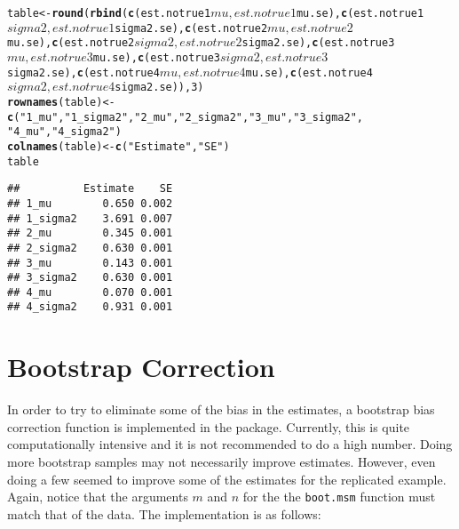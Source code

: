 \documentclass{article}\usepackage{graphicx, color}
\makeatletter
\newcommand{\hlfunctioncall}[1]{\textcolor[rgb]{0.501960784313725,0,0.329411764705882}{\textbf{#1}}}%
\newcommand{\hlstring}[1]{\textcolor[rgb]{0.6,0.6,1}{#1}}%
\newenvironment{kframe}{%
 \def\at@end@of@kframe{}%
 \ifinner\ifhmode%
  \def\at@end@of@kframe{\end{minipage}}%
  \begin{minipage}{\columnwidth}%
 \fi\fi%
 \def\FrameCommand##1{\hskip\@totalleftmargin \hskip-\fboxsep
 \colorbox{shadecolor}{##1}\hskip-\fboxsep
     \hskip-\linewidth \hskip-\@totalleftmargin \hskip\columnwidth}%
 \MakeFramed {\advance\hsize-\width
   \@totalleftmargin\z@ \linewidth\hsize
   \@setminipage}}%
 {\par\unskip\endMakeFramed%
 \at@end@of@kframe}
\newenvironment{knitrout}{}{} %
\makeatother
\begin{document}
\begin{knitrout}
\begin{kframe}
\begin{alltt}
table <- \hlfunctioncall{round}(\hlfunctioncall{rbind}(\hlfunctioncall{c}(est.notrue1$mu, est.notrue1$mu.se), \hlfunctioncall{c}(est.notrue1$sigma2, 
    est.notrue1$sigma2.se), \hlfunctioncall{c}(est.notrue2$mu, est.notrue2$mu.se), \hlfunctioncall{c}(est.notrue2$sigma2, 
    est.notrue2$sigma2.se), \hlfunctioncall{c}(est.notrue3$mu, est.notrue3$mu.se), \hlfunctioncall{c}(est.notrue3$sigma2, 
    est.notrue3$sigma2.se), \hlfunctioncall{c}(est.notrue4$mu, est.notrue4$mu.se), \hlfunctioncall{c}(est.notrue4$sigma2, 
    est.notrue4$sigma2.se)), 3)
\hlfunctioncall{rownames}(table) <- \hlfunctioncall{c}(\hlstring{"1_mu"}, \hlstring{"1_sigma2"}, \hlstring{"2_mu"}, \hlstring{"2_sigma2"}, \hlstring{"3_mu"}, \hlstring{"3_sigma2"}, 
    \hlstring{"4_mu"}, \hlstring{"4_sigma2"})
\hlfunctioncall{colnames}(table) <- \hlfunctioncall{c}(\hlstring{"Estimate"}, \hlstring{"SE"})
table
\end{alltt}
\begin{verbatim}
##          Estimate    SE
## 1_mu        0.650 0.002
## 1_sigma2    3.691 0.007
## 2_mu        0.345 0.001
## 2_sigma2    0.630 0.001
## 3_mu        0.143 0.001
## 3_sigma2    0.630 0.001
## 4_mu        0.070 0.001
## 4_sigma2    0.931 0.001
\end{verbatim}
\end{kframe}
\end{knitrout}

\newpage\section{Bootstrap Correction}

In order to try to eliminate some of the bias in the estimates, a bootstrap bias correction function is implemented in the package.  Currently, this is quite computationally intensive and it is not recommended to do a high number.  Doing more bootstrap samples may not necessarily improve estimates.  However, even doing a few seemed to improve some of the estimates for the replicated example.  Again, notice that the arguments $m$ and $n$ for the the {\tt boot.msm} function must match that of the data.  The implementation is as follows:
\end{document}
